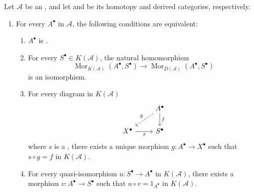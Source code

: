 \begin{proposition} \label{proposition:equivalent_conditions_for_a_complex_in_an_abelian_category_to_be_K_projective_K_injective}
    Let $\mathcal{A}$ be an , and let  and  be its homotopy and derived categories, respectively.
    
    \begin{enumerate}
        \item For every  $A^{\bullet}$ in $\mathcal{A}$, the following conditions are equivalent:
        \begin{enumerate}
            \item $A^{\bullet}$ is .
            \item For every $S^{\bullet} \in K(\mathcal{A})$, the natural homomorphism 
            \[ \operatorname{Mor}_{K(\mathcal{A})}(A^{\bullet}, S^{\bullet}) \to \operatorname{Mor}_{D(\mathcal{A})}(A^{\bullet}, S^{\bullet}) \]
            is an isomorphism.
            \item For every diagram in $K(\mathcal{A})$
            \[ \begin{tikzcd}
                & A^\bullet \arrow[d, "f"] \arrow[ld, dashed, "g"'] \\
                X^\bullet \arrow[r, "s"'] & S^\bullet
            \end{tikzcd} \]
            where $s$ is a , there exists a unique morphism $g: A^{\bullet} \to X^{\bullet}$ such that $s \circ g = f$ in $K(\mathcal{A})$.
            \item For every quasi-isomorphism $u: S^{\bullet} \to A^{\bullet}$ in $K(\mathcal{A})$, there exists a morphism $v: A^{\bullet} \to S^{\bullet}$ such that $u \circ v = 1_{A^{\bullet}}$ in $K(\mathcal{A})$.
        \end{enumerate}


\end{enumerate}
\end{proposition}
